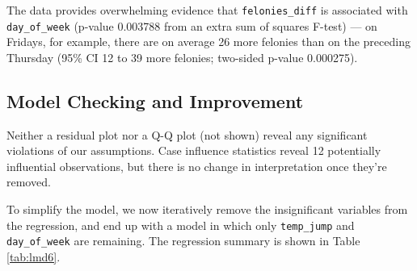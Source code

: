 \documentclass[11pt,notitlepage]{article}
\newenvironment{codeSmall}%
   {\par\noindent\adjustbox{margin=1ex,bgcolor=shadecolor,margin=0ex \medskipamount}\bgroup\minipage\linewidth\verbatim\footnotesize}%
   {\endverbatim\endminipage\egroup}
\begin{document}
The data provides overwhelming evidence that \texttt{felonies_diff} is associated with \texttt{day_of_week} (p-value 0.003788 from an extra sum of squares F-test) --- on Fridays, for example, there are on average 26 more felonies than on the preceding Thursday (95\% CI 12 to 39 more felonies; two-sided p-value 0.000275).


\subsection{Model Checking and Improvement}
\label{sec:modelFeloniesDiffModelCheckingImprovement}


Neither a residual plot nor a Q-Q plot (not shown) reveal any significant violations of our assumptions. Case influence statistics reveal 12 potentially influential observations, but there is no change in interpretation once they're removed.

To simplify the model, we now iteratively remove the insignificant variables from the regression, and end up with a model in which only \texttt{temp_jump} and \texttt{day_of_week} are remaining. The regression summary is shown in Table \ref{tab:lmd6}.

\end{document}
